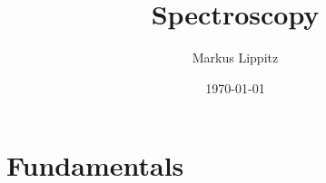 \documentclass[nofonts,a4paper,oneside,nobib]{tufte-book}
\begin{document}

\title{Spectroscopy}

\author{Markus Lippitz}
\date{\today}



\maketitle

\tableofcontents

\part{Fundamentals}







\nocite{*}

\printbibliography
\end{document}
